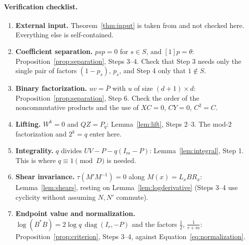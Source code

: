 \documentclass[11pt]{article}
\theoremstyle{remark}
\numberwithin{equation}{section}
\newcommand{\diag}{\operatorname{diag}}
\begin{document}
\paragraph{Verification checklist.}
\begin{enumerate}[leftmargin=2.2em,itemsep=2pt]
\item \textbf{External input.} Theorem~\ref{thm:input} is taken from \cite{CharacteristicTwo} and not checked here. Everything else is self-contained.
\item \textbf{Coefficient separation.} $psp=0$ for $s\in S$, and $[1]p=\theta$: Proposition~\ref{prop:separation}, Steps 3--4. Check that Step 3 needs only the single pair of factors $(1-p_s)$, $p_s$, and Step 4 only that $1\notin S$.
\item \textbf{Binary factorization.} $uv=\bar P$ with $u$ of size $(d+1)\times d$: Proposition~\ref{prop:separation}, Step 6. Check the order of the noncommutative products and the use of $XC=0$, $CY=0$, $C^2=C$.
\item \textbf{Lifting.} $W^k=0$ and $QZ=P_q$: Lemma~\ref{lem:lift}, Steps 2--3. The mod-$2$ factorization and $2^k=q$ enter here.
\item \textbf{Integrality.} $q$ divides $UV-P-q(I_m-P)$: Lemma~\ref{lem:integral}, Step 1. This is where $q\equiv1\pmod D$ is needed.
\item \textbf{Shear invariance.} $\tau(M'M^{-1})=0$ along $M(x)=L_xBR_x$: Lemma~\ref{lem:shears}, resting on Lemma~\ref{lem:logderivative} (Steps 3--4 use cyclicity without assuming $N,N'$ commute).
\item \textbf{Endpoint value and normalization.} $\log(B^*B)=2\log q\,\diag(I_r,-P)$ and the factors $\frac12$, $\frac1{r+m}$: Proposition~\ref{prop:criterion}, Steps 3--4, against Equation~\eqref{eq:normalization}.
\end{enumerate}

\begingroup
\raggedright


\endgroup
\end{document}
